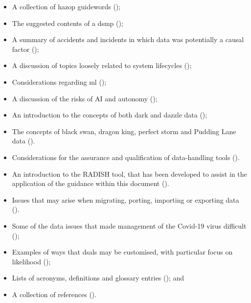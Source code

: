 \begin{itemize}
\begin{itemize}
		\item A collection of \gls{hazop} guidewords ();
		\item The suggested contents of a \gls{dsmp} ();
		\item A summary of accidents and incidents in which data was potentially a causal factor ();
		\item A discussion of topics loosely related to system lifecycles ();
		\item Considerations regarding \gls{ml} ();
		\item A discussion of the risks of AI and autonomy ();
		\item An introduction to the concepts of both dark and dazzle data ();
		\item The concepts of black swan, dragon king, perfect storm and Pudding Lane data ().
		\item Considerations for the assurance and qualification of data-handling tools ().
		\item An introduction to the RADISH tool, that has been developed to assist in the application of the guidance within this document ().
		\item Issues that may arise when migrating, porting, importing or exporting data ().            
		\item Some of the data issues that made management of the Covid-19 virus difficult ();
		\item Examples of ways that \glspl{dsal} may be customised, with particular focus on likelihood ();
		\item Lists of acronyms, definitions and glossary entries (); and
		\item A collection of references ().
	\end{itemize}
\end{itemize}

%
%
\makeatletter		%
\dsiwg@intblankpage
\makeatother
\setcounter{tocdepth}{2}
\tableofcontents

%
%
\listoftables
%
\listoffigures
\cleardoublepage%
